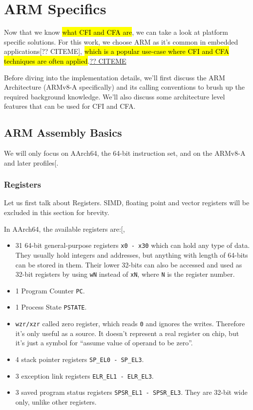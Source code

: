 \documentclass[a4paper, nobind]{templates/ociamthesis}
\providecommand{\tightlist}{%
  \setlength{\itemsep}{0pt}\setlength{\parskip}{0pt}}
\begin{document}
\section{ARM Specifics}\label{arm-specifics}

Now that we know \hl{what CFI and CFA are}, we can take a look at platform specific solutions.
For this work, we choose ARM as it's common in embedded applications{[}?? CITEME{]},
\hl{which is a popular use-case where CFI and CFA techniques are often applied}.\href{}{?? CITEME}

Before diving into the implementation details, we'll first discuss the ARM Architecture
(ARMv8-A specifically) and its calling conventions to brush up the required background knowledge.
We'll also discuss some architecture level features that can be used for CFI and CFA.

\subsection{ARM Assembly Basics}\label{arm-assembly-basics}

We will only focus on AArch64, the 64-bit instruction set, and on the ARMv8-A and later profiles{[}\citeproc{ref-arm-arch-manual}{7}{]}.

\subsubsection{Registers}\label{registers}

Let us first talk about Registers.
SIMD, floating point and vector registers will be excluded in this section for brevity.

In AArch64, the available registers are:{[}, \citeproc{ref-arm-isa}{6}{]}

\begin{itemize}
\tightlist
\item
  31 64-bit general-purpose registers \texttt{x0\ -\ x30} which can hold any type of data.
  They usually hold integers and addresses, but anything with length of 64-bits
  can be stored in them. Their lower 32-bits can also be accessed and used as
  32-bit registers by using \texttt{wN} instead of \texttt{xN}, where \texttt{N} is the register number.
\item
  1 Program Counter \texttt{PC}.
\item
  1 Process State \texttt{PSTATE}.
\item
  \texttt{wzr/xzr} called zero register,
  which reads \texttt{0} and ignores the writes. Therefore it's only useful as a source.
  It doesn't represent a real register on chip,
  but it's just a symbol for ``assume value of operand to be zero''.
\item
  4 stack pointer registers \texttt{SP\_EL0\ -\ SP\_EL3}.
\item
  3 exception link registers \texttt{ELR\_EL1\ -\ ELR\_EL3}.
\item
  3 saved program status registers \texttt{SPSR\_EL1\ -\ SPSR\_EL3}. They are 32-bit wide only,
  unlike other registers.
\end{itemize}
\end{document}
